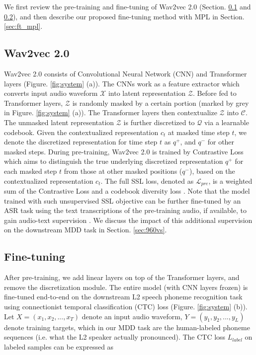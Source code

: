 \documentclass[a4paper]{article}
\begin{document}
We first review the pre-training and fine-tuning of Wav2vec 2.0 (Section. \ref{sec:w2v2} and \ref{sec:ft}), and then describe our proposed fine-tuning method with MPL in Section. \ref{sec:ft_mpl}.

\subsection{Wav2vec 2.0} \label{sec:w2v2}

 Wav2vec 2.0 consists of Convolutional Neural Network (CNN) and Transformer layers (Figure. \ref{fig:system} (a)). The CNNs work as a feature extractor which converts input audio waveform $\mathcal{X}$ into latent representation $\mathcal{Z}$. Before fed to Transformer layers, $\mathcal{Z}$ is randomly masked by a certain portion (marked by grey in Figure. \ref{fig:system} (a)). The Transformer layers then contextualize $\mathcal{Z}$ into $\mathcal{C}$. The unmasked latent representation $\mathcal{Z}$ is further discretized to $\mathcal{Q}$ via a learnable codebook. Given the contextualized representation $c_{t}$ at masked time step $t$, we denote the discretized representation for time step $t$ as $q^+$, and $q^-$ for other masked steps. During pre-training, Wav2vec 2.0 is trained by Contrastive Loss which aims to distinguish the true underlying discretized representation $q^+$ for each masked step $t$ from those at other masked positions ($q^-$), based on the contextualized representation $c_{t}$. The full SSL loss, denoted as $\mathcal{L}_{pre}$, is a weighted sum of the Contrastive Loss and a codebook diversity loss \cite{baevski2020wav2vec}. Note that the model trained with such unsupervised SSL objective can be further fine-tuned by an ASR task using the text transcriptions of the pre-training audio, if available, to gain audio-text supervision \cite{baevski2020wav2vec}. We discuss the impact of this additional supervision on the downstream MDD task in Section. \ref{sec:960vs}.

\subsection{Fine-tuning} \label{sec:ft}

After pre-training, we add linear layers on top of the Transformer layers, and remove the discretization module. The entire model (with CNN layers frozen) is fine-tuned end-to-end on the downstream L2 speech phoneme recognition task using connectionist temporal classification (CTC) loss \cite{graves2006connectionist} (Figure. \ref{fig:system} (b)). Let $X=(x_1, x_2, ..., x_T)$ denote an input audio waveform, $Y=(y_1, y_2, ..., y_L)$ denote training targets, which in our MDD task are the human-labeled phoneme sequences (i.e. what the L2 speaker actually pronounced). The CTC loss $L_{label}$ on labeled samples can be expressed as
\end{document}
